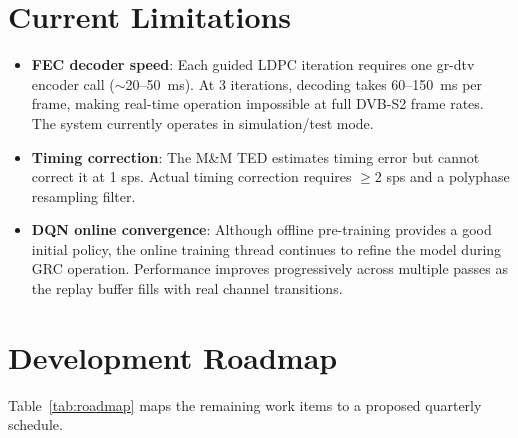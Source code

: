\documentclass[12pt,a4paper]{report}
\begin{document}
\section{Current Limitations}

\begin{itemize}
    \item \textbf{FEC decoder speed}: Each guided LDPC iteration requires one
          gr-dtv encoder call ($\sim$20--50~ms). At 3 iterations, decoding takes
          60--150~ms per frame, making real-time operation impossible at full
          DVB-S2 frame rates. The system currently operates in simulation/test mode.
    \item \textbf{Timing correction}: The M\&M TED estimates timing error but
          cannot correct it at 1 sps. Actual timing correction requires
          $\geq 2$ sps and a polyphase resampling filter.
    \item \textbf{DQN online convergence}: Although offline pre-training
          provides a good initial policy, the online training thread continues
          to refine the model during GRC operation. Performance improves
          progressively across multiple passes as the replay buffer fills with
          real channel transitions.
\end{itemize}

\section{Development Roadmap}
\label{sec:roadmap}

Table~\ref{tab:roadmap} maps the remaining work items to a proposed quarterly
schedule.
\end{document}
